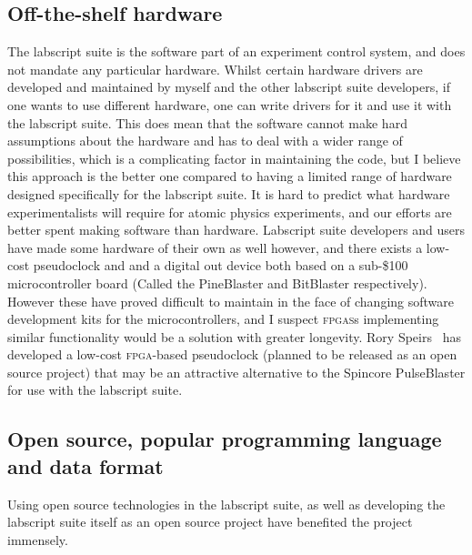 \subsection{Off-the-shelf hardware}

The labscript suite is the software part of an experiment control system, and does not mandate any particular hardware. Whilst certain hardware drivers are developed and maintained by myself and the other labscript suite developers, if one wants to use different hardware, one can write drivers for it and use it with the labscript suite. This does mean that the software cannot make hard assumptions about the hardware and has to deal with a wider range of possibilities, which is a complicating factor in maintaining the code, but I believe this approach is the better one compared to having a limited range of hardware designed specifically for the labscript suite. It is hard to predict what hardware experimentalists will require for atomic physics experiments, and our efforts are better spent making software than hardware. Labscript suite developers and users have made some hardware of their own as well however, and there exists a low-cost pseudoclock and and a digital out device both based on a sub-\$100 microcontroller board (Called the PineBlaster and BitBlaster respectively). However these have proved difficult to maintain in the face of changing software development kits for the microcontrollers, and I suspect \textsc{fpgas}s implementing similar functionality would be a solution with greater longevity. Rory Speirs~\cite{speirs__2018-1} has developed a low-cost \textsc{fpga}-based pseudoclock (planned to be released as an open source project) that may be an attractive alternative to the Spincore PulseBlaster for use with the labscript suite.

\subsection{Open source, popular programming language and data format}

Using open source technologies in the labscript suite, as well as developing the labscript suite itself as an open source project have benefited the project immensely.

